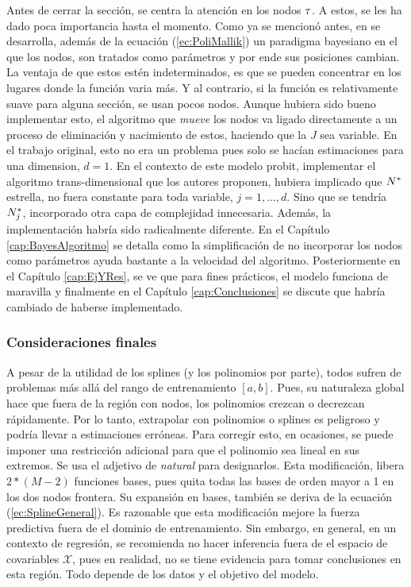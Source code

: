 \documentclass[../Main/Main.tex]{subfiles}
\begin{document}
Antes de cerrar la sección, se centra la atención en los nodos $\tau$. A estos, se les ha dado poca importancia hasta el momento. Como ya se mencionó antes, en \autocite{mallik1998automatic} se desarrolla, además de la ecuación (\ref{ec:PoliMallik}) un paradigma bayesiano en el que los nodos, son tratados como parámetros y por ende sus posiciones cambian. La ventaja de que estos estén indeterminados, es que se pueden concentrar en los lugares donde la función varia más. Y al contrario, si la función es relativamente suave para alguna sección, se usan pocos nodos. Aunque hubiera sido bueno implementar esto, el algoritmo que \textit{mueve} los nodos va ligado directamente a un proceso de eliminación y nacimiento de estos, haciendo que la $J$ sea variable. En el trabajo original, esto no era un problema pues solo se hacían estimaciones para una dimension, $d=1$. En el contexto de este modelo probit, implementar el algoritmo trans-dimensional que los autores proponen, hubiera implicado que $N^*$ estrella, no fuera constante para toda variable, $j = 1,\ldots,d$. Sino que se tendría $N^*_j$, incorporado otra capa de complejidad innecesaria. Además, la implementación habría sido radicalmente diferente. En el Capítulo \ref{cap:BayesAlgoritmo} se detalla como la simplificación de no incorporar los nodos como parámetros ayuda bastante a la velocidad del algoritmo. Posteriormente en el Capítulo \ref{cap:EjYRes}, se ve que para fines prácticos, el modelo funciona de maravilla y finalmente en el Capítulo \ref{cap:Conclusiones} se discute que habría cambiado de haberse implementado. \\

\subsubsection*{Consideraciones finales}
A pesar de la utilidad de los splines (y los polinomios por parte), todos sufren de problemas más allá del rango de entrenamiento $[a,b]$. Pues, su naturaleza global hace que fuera de la región con nodos, los polinomios crezcan o decrezcan rápidamente. Por lo tanto, extrapolar con polinomios o splines es peligroso y podría llevar a estimaciones erróneas. Para corregir esto, en ocasiones, se puede imponer una restricción adicional para que el polinomio sea lineal en sus extremos. Se usa el adjetivo de \textit{natural} para designarlos. Esta modificación, libera $2*(M-2)$ funciones bases, pues quita todas las bases de orden mayor a 1 en los dos nodos frontera. Su expansión en bases, también se deriva de la ecuación (\ref{ec:SplineGeneral}). Es razonable que esta modificación mejore la fuerza predictiva fuera de el dominio de entrenamiento. Sin embargo, en general, en un contexto de regresión, se recomienda no hacer inferencia fuera de el espacio de covariables $\mathcal{X}$, pues en realidad, no se tiene evidencia para tomar conclusiones en esta región.  Todo depende de los datos y el objetivo del modelo.\\
\end{document}
